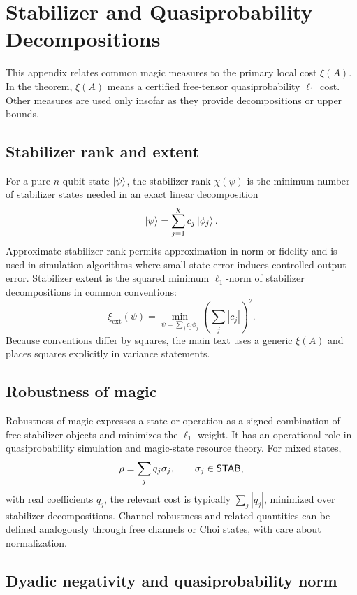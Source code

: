 \section{Stabilizer and Quasiprobability Decompositions}
\label{app:stabilizer}

This appendix relates common magic measures to the primary local cost \(\xi(A)\). In the theorem, \(\xi(A)\) means a certified free-tensor quasiprobability \(\ell_1\) cost. Other measures are used only insofar as they provide decompositions or upper bounds.

\subsection{Stabilizer rank and extent}

For a pure \(n\)-qubit state \(\left|\psi\right\rangle\), the stabilizer rank \(\chi(\psi)\) is the minimum number of stabilizer states needed in an exact linear decomposition
\[
\left|\psi\right\rangle=\sum_{j=1}^{\chi} c_j\left|\phi_j\right\rangle.
\]
Approximate stabilizer rank permits approximation in norm or fidelity and is used in simulation algorithms where small state error induces controlled output error. Stabilizer extent is the squared minimum \(\ell_1\)-norm of stabilizer decompositions in common conventions:
\[
\xi_{\mathrm{ext}}(\psi)
=\min_{\psi=\sum_j c_j\phi_j}\left(\sum_j |c_j|\right)^2.
\]
Because conventions differ by squares, the main text uses a generic \(\xi(A)\) and places squares explicitly in variance statements.

\subsection{Robustness of magic}

Robustness of magic expresses a state or operation as a signed combination of free stabilizer objects and minimizes the \(\ell_1\) weight. It has an operational role in quasiprobability simulation and magic-state resource theory. For mixed states,
\[
\rho=\sum_j q_j\sigma_j,\qquad \sigma_j\in\mathsf{STAB},
\]
with real coefficients \(q_j\), the relevant cost is typically \(\sum_j |q_j|\), minimized over stabilizer decompositions. Channel robustness and related quantities can be defined analogously through free channels or Choi states, with care about normalization.

\subsection{Dyadic negativity and quasiprobability norm}

